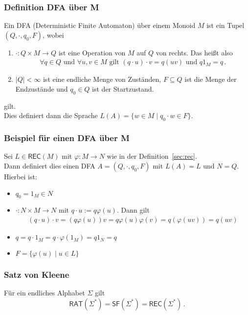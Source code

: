 \documentclass[12pt, german]{article}
\newcommand{\rat}{\mathsf{RAT}}
\newcommand{\rec}{\mathsf{REC}}
\newcommand{\starfree}{\mathsf{SF}}
\begin{document}
	\subsubsection{Definition DFA über M}
	Ein DFA (Deterministic Finite Automaton) über einem Monoid $M$ ist ein Tupel $(Q, \cdot, q_0, F)$, wobei
	\begin{enumerate}[label=\arabic*)]
		\item $\cdot: Q \times M \to Q$ ist eine Operation von $M$ auf $Q$ von rechts. Das heißt also
		\begin{align*}
			\forall q \in Q \text{ und } \forall u,v \in M \text{ gilt } (q \cdot u) \cdot v = q(uv) \text{ und } q1_M = q \, . 
		\end{align*}
		\item $|Q| < \infty$ ist eine endliche Menge von Zuständen, $F\subseteq Q$ ist die Menge der Endzustände und $q_0 \in Q$ ist der Startzustand. \\
	\end{enumerate}
	gilt.\\
	Dies definiert dann die Sprache $L(A) = \{w \in M \mid q_0\cdot w \in F\}$.
	
	\subsubsection{Beispiel für einen DFA über M}
	Sei $L \in \rec(M)$ mit $\varphi: M \to N$ wie in der Definition~\ref{sec:rec}. \\ 
	Dann definiert dies einen DFA $A = (Q,\cdot, q_0, F)$ mit $L(A) = L$ und $N = Q$. 
	Hierbei ist: 
	\begin{itemize}
		\item $q_0 = 1_M \in N$
		\item $\cdot : N \times M \to N$ mit $q\cdot u := q\varphi(u)$. Dann gilt
		\begin{align*}
			(q \cdot u)\cdot v = (q\varphi(u))v = q \varphi(u)\varphi(v) = q(\varphi(uv)) = q(uv)
		\end{align*}
		\item $q = q \cdot 1_M = q \cdot \varphi(1_M) = q1_N = q$
		\item $F = \{\varphi(u) \mid u \in L \}$
	\end{itemize}

	\subsubsection{Satz von Kleene}
	Für ein endliches Alphabet $\Sigma$ gilt $$\rat(\Sigma^*)=\starfree(\Sigma^*)=\rec(\Sigma^*)\,.$$
	
\end{document}
